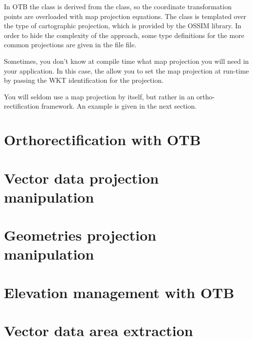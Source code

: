 In OTB the  class is derived from the
 class, so the coordinate transformation
points are overloaded with map projection equations. The
 class is templated over the type of
cartographic projection, which is provided by the OSSIM library. In
order to hide the complexity of the approach, some type definitions
for the more common projections are given in the file
 file.

Sometimes, you don't know at compile time what map projection you will need in
your application. In this case, the 
allow you to set the map projection at run-time by passing the WKT identification
for the projection.



You will seldom use a map projection by itself, but rather in an
ortho-rectification framework. An example is given in the next section.




\section{Orthorectification with OTB}
\ifitkFullVersion
\label{sec:OrthorectificationwithOTB}
\fi


\section{Vector data projection manipulation}
\ifitkFullVersion
\label{sec:VectorDataProjection}
\fi


\section{Geometries projection manipulation}
\ifitkFullVersion
\label{sec:GeometriesProjection}
\fi


\section{Elevation management with OTB}


\section{Vector data area extraction}
\ifitkFullVersion
\label{sec:VectorDataAreaExtraction}
\fi


